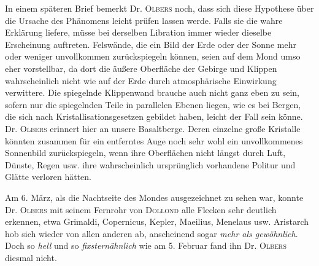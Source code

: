 In einem späteren Brief bemerkt Dr. \textsc{Olbers} noch, dass sich diese Hypothese über die Ursache des Phänomens leicht prüfen lassen werde. Falls sie die wahre Erklärung liefere, müsse bei derselben Libration immer wieder dieselbe Erscheinung auftreten. Felswände, die ein Bild der Erde oder der Sonne mehr oder weniger unvollkommen zurückspiegeln können, seien auf dem Mond umso eher vorstellbar, da dort die äußere Oberfläche der Gebirge und Klippen wahrscheinlich nicht wie auf der Erde durch atmosphärische Einwirkung verwittere. Die spiegelnde Klippenwand brauche auch nicht ganz eben zu sein, sofern nur die spiegelnden Teile in parallelen Ebenen liegen, wie es bei Bergen, die sich nach Kristallisationsgesetzen gebildet haben, leicht der Fall sein könne. Dr. \textsc{Olbers} erinnert hier an unsere Basaltberge. Deren einzelne große Kristalle könnten zusammen für ein entferntes Auge noch sehr wohl ein unvollkommenes Sonnenbild zurückspiegeln, wenn ihre Oberflächen nicht längst durch Luft, Dünste, Regen usw. ihre wahrscheinlich ursprünglich vorhandene Politur und Glätte verloren hätten.

Am 6. März, als die Nachtseite des Mondes ausgezeichnet zu sehen war, konnte Dr. \textsc{Olbers} mit seinem Fernrohr von \textsc{Dollond} alle Flecken sehr deutlich erkennen, etwa Grimaldi, Copernicus, Kepler, Maeilius, Menelaus usw. Aristarch hob sich wieder von allen anderen ab, anscheinend sogar \emph{mehr als gewöhnlich}. Doch so \emph{hell} und so \emph{fixsternähnlich} wie am 5. Februar fand ihn Dr. \textsc{Olbers} diesmal nicht.
